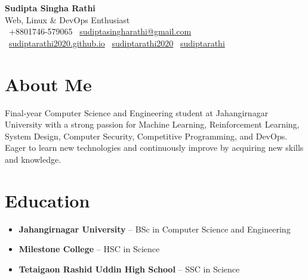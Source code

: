 \documentclass[a4paper,10pt]{article}
\begin{document}
\begin{minipage}{0.70\textwidth}
    {\LARGE\bfseries Sudipta Singha Rathi}\\[0.5em]
    {\large Web, Linux \& DevOps Enthusiast}\\[0.5em]
    \faPhone \ +8801746-579065 \quad \faEnvelope \ \href{mailto:sudiptasingharathi@gmail.com}{sudiptasingharathi@gmail.com}  \\
    \faGlobe \ \href{https://sudiptarathi2020.github.io}{sudiptarathi2020.github.io}
    \faGithub \ \href{https://github.com/sudiptarathi2020}{sudiptarathi2020}
    \faLinkedin \ \href{https://www.linkedin.com/in/sudiptarathi/}{sudiptarathi} \quad
    
\end{minipage}%
\hfill

\vspace{1em}

\section*{About Me}
Final-year Computer Science and Engineering student at Jahangirnagar University with a strong passion for Machine Learning, Reinforcement Learning, System Design, Computer Security, Competitive Programming, and DevOps. Eager to learn new technologies and continuously improve by acquiring new skills and knowledge.

\section*{Education}
\begin{itemize}[leftmargin=0.5cm]
    \item \textbf{Jahangirnagar University} – BSc in Computer Science and Engineering
    \item \textbf{Milestone College} – HSC in Science
    \item \textbf{Tetaigaon Rashid Uddin High School} – SSC in Science
\end{itemize}
\end{document}
